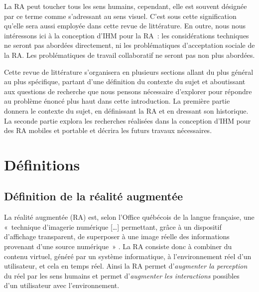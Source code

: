 
La RA peut toucher tous les sens humains, cependant, elle est souvent désignée par ce terme comme s'adressant au sens visuel. C'est sous cette signification qu'elle sera aussi employée dans cette revue de littérature. En outre, nous nous intéressons ici à la conception d'IHM pour la RA~: les considérations techniques ne seront pas abordées directement, ni les problématiques d'acceptation sociale de la RA. Les problématiques de travail collaboratif ne seront pas non plus abordées.

Cette revue de littérature s'organisera en plusieurs sections allant du plus général au plus spécifique, partant d'une définition du contexte du sujet et aboutissant aux questions de recherche que nous pensons nécessaire d'explorer pour répondre au problème énoncé plus haut dans cette introduction. La première partie donnera le contexte du sujet, en définissant la RA et en dressant son historique. La seconde partie explora les recherches réalisées dans la conception d'IHM pour des RA mobiles et portable et décrira les futurs travaux nécessaires.



\section*{Définitions}
\subsection*{Définition de la réalité augmentée}
La réalité augmentée (RA) est, selon l'Office québécois de la langue française, une «~technique d'imagerie numérique […] permettant, grâce à un dispositif d'affichage transparent, de superposer à une image réelle des informations provenant d'une source numérique~» \citep{OfficeQuebecoisLangueFrancaiseRA2015}. La RA consiste donc à combiner du contenu virtuel, généré par un système informatique, à l'environnement réel d'un utilisateur, et cela en temps réel. Ainsi la RA permet d'\emph{augmenter la perception} du réel par les sens humains et permet d'\emph{augmenter les interactions} possibles d'un utilisateur avec l'environnement. \citep{Azuma1997}


